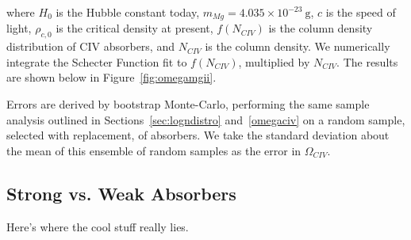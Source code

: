 where $H_0$ is the Hubble constant today, $m_{Mg} = 4.035 \times 10^{-23}~\mathrm{g}$, $c$ is the speed of light, $\rho_{c,0}$ is the critical density at present, $f(N_{CIV})$ is the column density distribution of {CIV} absorbers, and $N_{CIV}$ is the column density. We numerically integrate the Schecter Function fit to $f(N_{CIV})$, multiplied by $N_{CIV}$. The results are shown below in Figure~\ref{fig:omegamgii}.

\begin{figure*}[bth]
\caption{$\Omega_{\CIV}$ as a function of redshift. The cosmic mass density of {\CIV} stays roughly flat near a value of $1 \times 10^{-9}$, with a potential increase from $z = 0.1$ to $z = 2.5$.}
\label{fig:omegamgii}
\end{figure*}

Errors are derived by bootstrap Monte-Carlo, performing the same sample analysis outlined in Sections~\ref{sec:logndistro} and~\ref{omegaciv} on a random sample, selected with replacement, of {\CIV} absorbers.  We take the standard deviation about the mean of this ensemble of random samples as the error in $\Omega_{CIV}$.

\subsection{Strong vs. Weak Absorbers}
\label{ch6:strongweak}

Here's where the cool stuff really lies.
